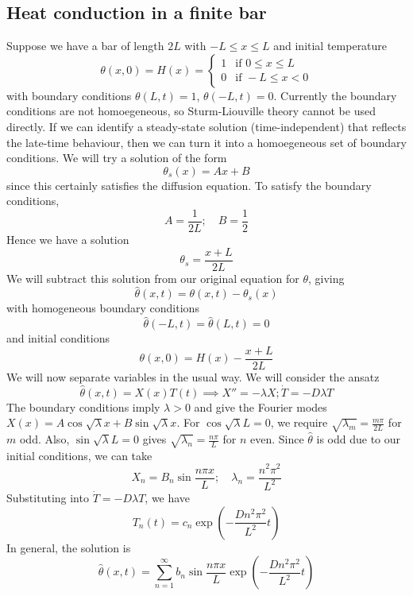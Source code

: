 \subsection{Heat conduction in a finite bar}
Suppose we have a bar of length \( 2L \) with \( -L \leq x \leq L \) and initial temperature
\[
	\theta(x,0) = H(x) = \begin{cases}
		1 & \text{if } 0 \leq x \leq L \\
		0 & \text{if } -L \leq x < 0
	\end{cases}
\]
with boundary conditions \( \theta(L, t) = 1 \), \( \theta(-L, t) = 0 \).
Currently the boundary conditions are not homoegeneous, so Sturm-Liouville theory cannot be used directly.
If we can identify a steady-state solution (time-independent) that reflects the late-time behaviour, then we can turn it into a homoegeneous set of boundary conditions.
We will try a solution of the form
\[
	\theta_s(x) = Ax + B
\]
since this certainly satisfies the diffusion equation.
To satisfy the boundary conditions,
\[
	A = \frac{1}{2L};\quad B = \frac{1}{2}
\]
Hence we have a solution
\[
	\theta_s = \frac{x + L}{2L}
\]
We will subtract this solution from our original equation for \( \theta \), giving
\[
	\hat \theta(x,t) = \theta(x,t) - \theta_s(x)
\]
with homogeneous boundary conditions
\[
	\hat \theta(-L, t) = \hat \theta(L, t) = 0
\]
and initial conditions
\[
	\theta(x,0) = H(x) - \frac{x+L}{2L}
\]
We will now separate variables in the usual way.
We will consider the ansatz
\[
	\hat \theta(x,t) = X(x) T(t) \implies X'' = - \lambda X; \dot T = -D \lambda T
\]
The boundary conditions imply \( \lambda > 0 \) and give the Fourier modes \( X(x) = A \cos \sqrt{\lambda} x + B \sin \sqrt{\lambda} x \).
For \( \cos \sqrt{\lambda} L = 0 \), we require \( \sqrt{\lambda_m} = \frac{m \pi}{2L} \) for \( m \) odd.
Also, \( \sin \sqrt{\lambda} L = 0 \) gives \( \sqrt{\lambda_n} = \frac{n \pi}{L} \) for \( n \) even.
Since \( \hat \theta \) is odd due to our initial conditions, we can take
\[
	X_n = B_n \sin \frac{n \pi x}{L}; \quad \lambda_n = \frac{n^2 \pi^2}{L^2}
\]
Substituting into \( \dot T = -D \lambda T \), we have
\[
	T_n(t) = c_n \exp(-\frac{Dn^2 \pi^2}{L^2} t )
\]
In general, the solution is
\[
	\hat \theta(x,t) = \sum_{n=1}^\infty b_n \sin \frac{n \pi x}{L} \exp(-\frac{Dn^2 \pi^2}{L^2} t )
\]

